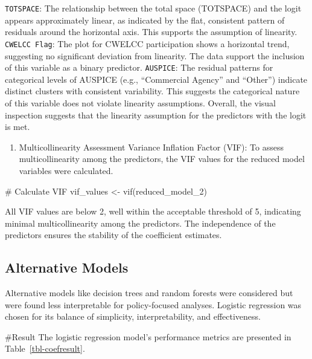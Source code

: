 \documentclass[
  letterpaper,
  DIV=11,
  numbers=noendperiod]{scrartcl}
\newenvironment{Shaded}{\begin{snugshade}}{\end{snugshade}}
\newcommand{\CommentTok}[1]{\textcolor[rgb]{0.37,0.37,0.37}{#1}}
\newcommand{\FunctionTok}[1]{\textcolor[rgb]{0.28,0.35,0.67}{#1}}
\newcommand{\NormalTok}[1]{\textcolor[rgb]{0.00,0.23,0.31}{#1}}
\newcommand{\OtherTok}[1]{\textcolor[rgb]{0.00,0.23,0.31}{#1}}
\providecommand{\tightlist}{%
  \setlength{\itemsep}{0pt}\setlength{\parskip}{0pt}}\usepackage{longtable,booktabs,array}
\begin{document}
\texttt{TOTSPACE}: The relationship between the total space (TOTSPACE)
and the logit appears approximately linear, as indicated by the flat,
consistent pattern of residuals around the horizontal axis. This
supports the assumption of linearity. \texttt{CWELCC\ Flag}: The plot
for CWELCC participation shows a horizontal trend, suggesting no
significant deviation from linearity. The data support the inclusion of
this variable as a binary predictor. \texttt{AUSPICE}: The residual
patterns for categorical levels of AUSPICE (e.g., ``Commercial Agency''
and ``Other'') indicate distinct clusters with consistent variability.
This suggests the categorical nature of this variable does not violate
linearity assumptions. Overall, the visual inspection suggests that the
linearity assumption for the predictors with the logit is met.

\begin{enumerate}
\def\labelenumi{\arabic{enumi}.}
\setcounter{enumi}{3}
\tightlist
\item
  Multicollinearity Assessment Variance Inflation Factor (VIF): To
  assess multicollinearity among the predictors, the VIF values for the
  reduced model variables were calculated.
\end{enumerate}

\begin{Shaded}
\begin{Highlighting}[]
\CommentTok{\# Calculate VIF}
\NormalTok{vif\_values }\OtherTok{\textless{}{-}} \FunctionTok{vif}\NormalTok{(reduced\_model\_2)}
\end{Highlighting}
\end{Shaded}

All VIF values are below 2, well within the acceptable threshold of 5,
indicating minimal multicollinearity among the predictors. The
independence of the predictors ensures the stability of the coefficient
estimates.

\subsection{Alternative Models}\label{alternative-models}

Alternative models like decision trees and random forests were
considered but were found less interpretable for policy-focused
analyses. Logistic regression was chosen for its balance of simplicity,
interpretability, and effectiveness.

\#Result The logistic regression model's performance metrics are
presented in Table~\ref{tbl-coefresult}.
\end{document}
